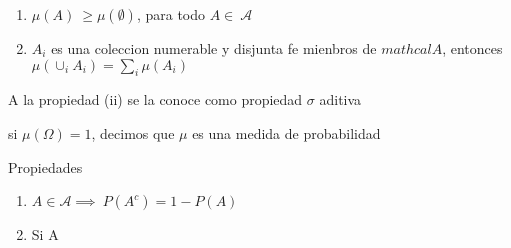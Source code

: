 \documentclass[
]{article}
\begin{document}
\begin{enumerate}
\def\labelenumi{(\roman{enumi})}
\item
  \(\mu(A)\ \geq \mu(\emptyset)\), para todo \(A \in\ \mathcal{A}\)
\item
  \(A_{i}\) es una coleccion numerable y disjunta fe mienbros de
  \(mathcal{A}\), entonces \(\mu(\cup_{i}A_i)=\sum_{i}\mu(A_i)\)
\end{enumerate}

A la propiedad (ii) se la conoce como propiedad \(\sigma\) aditiva

si \(\mu(\Omega) = 1\), decimos que \(\mu\) es una medida de
probabilidad

Propiedades

\begin{enumerate}
\def\labelenumi{\arabic{enumi})}
\item
  \(A \in \mathcal{A} \implies\ P(A^c)=1-P(A)\)
\item
  Si A
\end{enumerate}
\end{document}
